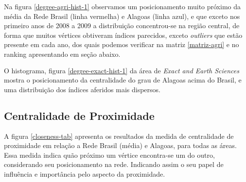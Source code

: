 Na figura \ref{degree-agri-hist-1} observamos um posicionamento muito próximo da média da Rede Brasil (linha vermelha) e Alagoas (linha azul), e que exceto nos primeiro anos de 2008 a 2009 a distribuição concentrou-se na região central, de forma que muitos vértices obtiveram índices parecidos, exceto \textit{outliers} que estão presente em cada ano, dos quais podemos verificar na matriz \ref{matriz-agri} e no ranking apresentando em seção abaixo.

O histograma, figura \ref{degree-exact-hist-1} da área de \textit{Exact and Earth Sciences} mostra o posicionamento da centralidade do grau de Alagoas acima do Brasil, e uma distribuição dos índices aferidos mais dispersos.


\subsection{\textbf{Centralidade de Proximidade}}

A figura \ref{closeness-tab} apresenta os resultados da medida de centralidade de proximidade em relação a Rede Brasil (média) e Alagoas, para todas as áreas. Essa medida indica quão próximo um vértice encontra-se um do outro, considerando seu posicionamento na rede. Indicando assim o seu papel de influência e importância pelo aspecto da proximidade.


